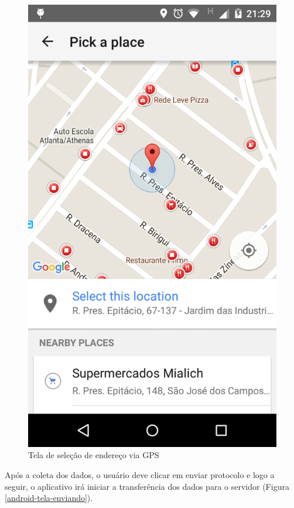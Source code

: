 \documentclass[
	article,			%
	11pt,				%
	oneside,			%
	a4paper,			%
	english,			%
	brazil,				%
	sumario=tradicional
	]{abntex2}
\begin{document}
\begin{figure}[!htbp]
\begin{minipage}{0.4\textwidth}
    \caption{\label{android-tela-gps}Tela de seleção de endereço via GPS}
    \includegraphics[scale=0.1]{android/4.png}
  \end{minipage}
\end{figure}


Após a coleta dos dados, o usuário deve clicar em enviar protocolo e logo a seguir, o aplicativo irá iniciar a transferência dos dados para o servidor (Figura \ref{android-tela-enviando}).
\end{document}
